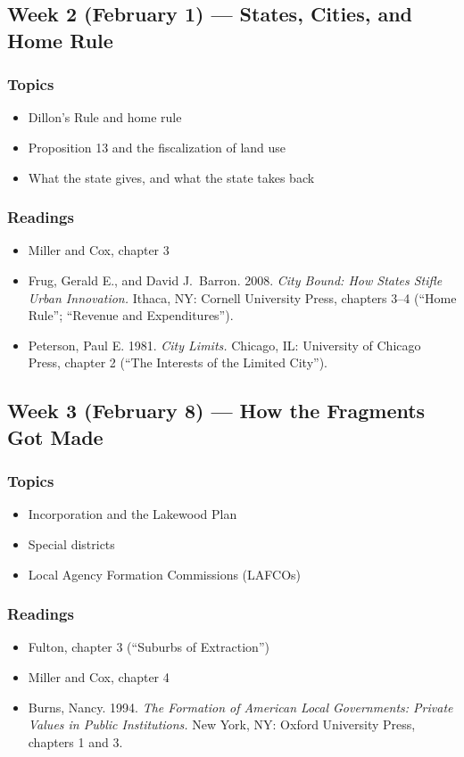\documentclass[12pt]{article}
\begin{document}
\subsection*{Week 2 (February 1) --- States, Cities, and Home Rule}
    \subsubsection*{Topics}
        \begin{itemize}
            \item Dillon's Rule and home rule
            \item Proposition 13 and the fiscalization of land use
            \item What the state gives, and what the state takes back
        \end{itemize}
    \subsubsection*{Readings}
        \begin{itemize}
            \item Miller and Cox, chapter 3
            \item Frug, Gerald E., and David J.\ Barron. 2008. \emph{City Bound: How States Stifle Urban Innovation.} Ithaca, NY: Cornell University Press, chapters 3--4 (``Home Rule''; ``Revenue and Expenditures'').
            \item Peterson, Paul E. 1981. \emph{City Limits.} Chicago, IL: University of Chicago Press, chapter 2 (``The Interests of the Limited City'').
        \end{itemize}

\subsection*{Week 3 (February 8) --- How the Fragments Got Made}
    \subsubsection*{Topics}
        \begin{itemize}
            \item Incorporation and the Lakewood Plan
            \item Special districts
            \item Local Agency Formation Commissions (LAFCOs)
        \end{itemize}
    \subsubsection*{Readings}
        \begin{itemize}
            \item Fulton, chapter 3 (``Suburbs of Extraction'')
            \item Miller and Cox, chapter 4
            \item Burns, Nancy. 1994. \emph{The Formation of American Local Governments: Private Values in Public Institutions.} New York, NY: Oxford University Press, chapters 1 and 3.
        \end{itemize}
\end{document}
